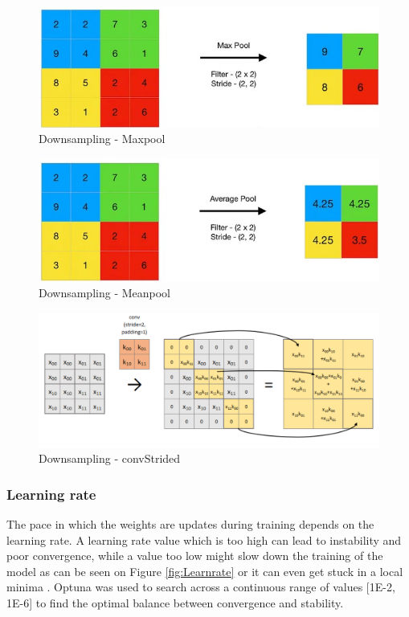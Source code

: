 \documentclass[twocolumn]{article}
\begin{document}
\begin{figure}
    \centering
    \includegraphics[width=1\linewidth]{Maxpool.jpg}
    \caption{Downsampling - Maxpool}
    \label{fig:maxpool}
\end{figure}

\begin{figure}
    \centering
    \includegraphics[width=1\linewidth]{Meanpool.jpg}
    \caption{Downsampling - Meanpool}
    \label{fig:meanpool}
\end{figure}

\begin{figure}
    \centering
    \includegraphics[width=1\linewidth]{ConvStrided_new.png}
    \caption{Downsampling - convStrided}
    \label{fig:convStrided}
\end{figure}

\subsubsection{Learning rate}
The pace in which the weights are updates during training depends on the learning rate. 
A learning rate value which is too high can lead to instability and poor convergence, while a value too low might slow down the training of the model  as can be seen on Figure \ref{fig:Learnrate} or it can even get stuck in a local minima \cite{jordan_2018_setting}. 
Optuna was used to search across a continuous range of values [1E-2, 1E-6] to find the optimal balance between convergence and stability.
\end{document}
